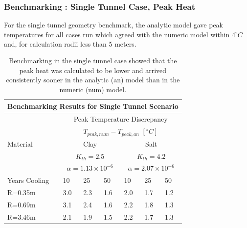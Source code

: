 
\begin{frame}
  \frametitle{Benchmarking : Single Tunnel Case, Peak Heat}
For the single tunnel geometry benchmark, the 
analytic model gave peak temperatures for all cases run which agreed with the 
numeric model within $4^{\circ}C$ and, for calculation radii less than 5 meters.

\footnotesize{
\begin{table}
  \centering
  \begin{tabular}{|l|l|l|l|l|l|l|}
    \multicolumn{7}{c}{\textbf{Benchmarking Results for Single Tunnel 
    Scenario}}\\
    \hline
    & \multicolumn{6}{|c|}{Peak Temperature Discrepancy}\\ 
    & \multicolumn{6}{|c|}{$T_{peak,num}-T_{peak,an}$ $[^{\circ}C]$} \\
    \hline
    Material & \multicolumn{3}{|c|}{Clay} & \multicolumn{3}{|c|}{Salt}\\ & 
    \multicolumn{3}{|c|}{$K_{th}=2.5$} & \multicolumn{3}{|c|}{$K_{th}=4.2$}\\ & 
    \multicolumn{3}{|c|}{$\alpha=1.13\times10^{-6}$} & 
    \multicolumn{3}{|c|}{$\alpha=2.07\times10^{-6}$}\\ 
    \hline
    Years Cooling  & 10     & 25      & 50      & 10     & 25     & 50\\
    \hline
     R=0.35m  & 3.0   & 2.3     & 1.6    & 2.0   & 1.7   & 1.2\\
     R=0.69m  & 3.1   & 2.4    & 1.6    & 2.2    & 1.8   & 1.3\\
     R=3.46m  & 2.1   & 1.9    & 1.5    & 2.2   & 1.7    & 1.3\\
    \hline
  \end{tabular}
  \caption{Benchmarking in the single tunnel case showed that the peak heat was 
  calculated to be lower and arrived consistently sooner in the analytic (an) 
  model than in the numeric (num) model.  }
\end{table}
}
\end{frame}

